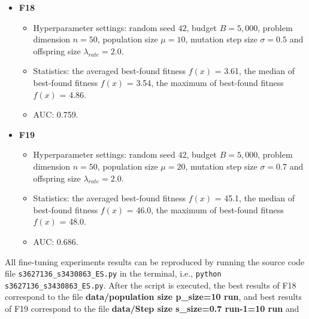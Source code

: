 \documentclass{article}
\begin{document}
\begin{itemize}
    \item \textbf{F18}
        \begin{itemize}
            \item Hyperparameter settings: random seed $42$, budget $B = 5,000$, problem dimension $n = 50$, population size $\mu = 10$, mutation step size $\sigma = 0.5$ and offspring size $\lambda_{rate} = 2.0$.
            \item Statistics: the averaged best-found fitness $f(x)$ = 3.61, the median of best-found fitness $f(x)$ = 3.54, the maximum of best-found fitness $f(x)$ = 4.86.
            \item AUC: 0.759.
        \end{itemize}
    \item \textbf{F19}
        \begin{itemize}
            \item Hyperparameter settings: random seed $42$, budget $B = 5,000$, problem dimension $n = 50$, population size $\mu = 20$, mutation step size $\sigma = 0.7$ and offspring size $\lambda_{rate} = 2.0$.
            \item Statistics: the averaged best-found fitness $f(x)$ = 45.1, the median of best-found fitness $f(x)$ = 46.0, the maximum of best-found fitness $f(x)$ = 48.0.
            \item AUC: 0.686.
        \end{itemize}
\end{itemize}

 All fine-tuning experiments results can be reproduced by running the source code file \texttt{s3627136\_s3430863\_ES.py} in the terminal, i.e., \texttt{python s3627136\_s3430863\_ES.py}. After the script is executed, the best results of F18 correspond to the file \textbf{data/population size p\_size=10 run}, and best results of F19 correspond to the file \textbf{data/Step size s\_size=0.7 run-1=10 run} and 
\end{document}
